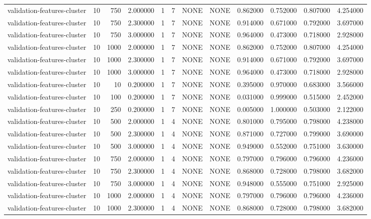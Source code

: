 \begin{tabular}{lrrrllllrrrr}
validation-features-cluster & 10 & 750 & 2.000000 & 1 & 7 & NONE & NONE & 0.862000 & 0.752000 & 0.807000 & 4.254000 \\
validation-features-cluster & 10 & 750 & 2.300000 & 1 & 7 & NONE & NONE & 0.914000 & 0.671000 & 0.792000 & 3.697000 \\
validation-features-cluster & 10 & 750 & 3.000000 & 1 & 7 & NONE & NONE & 0.964000 & 0.473000 & 0.718000 & 2.928000 \\
validation-features-cluster & 10 & 1000 & 2.000000 & 1 & 7 & NONE & NONE & 0.862000 & 0.752000 & 0.807000 & 4.254000 \\
validation-features-cluster & 10 & 1000 & 2.300000 & 1 & 7 & NONE & NONE & 0.914000 & 0.671000 & 0.792000 & 3.697000 \\
validation-features-cluster & 10 & 1000 & 3.000000 & 1 & 7 & NONE & NONE & 0.964000 & 0.473000 & 0.718000 & 2.928000 \\
validation-features-cluster & 10 & 10 & 0.200000 & 1 & 7 & NONE & NONE & 0.395000 & 0.970000 & 0.683000 & 3.566000 \\
validation-features-cluster & 10 & 100 & 0.200000 & 1 & 7 & NONE & NONE & 0.031000 & 0.999000 & 0.515000 & 2.452000 \\
validation-features-cluster & 10 & 250 & 0.200000 & 1 & 7 & NONE & NONE & 0.005000 & 1.000000 & 0.503000 & 2.122000 \\
validation-features-cluster & 10 & 500 & 2.000000 & 1 & 4 & NONE & NONE & 0.801000 & 0.795000 & 0.798000 & 4.238000 \\
validation-features-cluster & 10 & 500 & 2.300000 & 1 & 4 & NONE & NONE & 0.871000 & 0.727000 & 0.799000 & 3.690000 \\
validation-features-cluster & 10 & 500 & 3.000000 & 1 & 4 & NONE & NONE & 0.949000 & 0.552000 & 0.751000 & 3.630000 \\
validation-features-cluster & 10 & 750 & 2.000000 & 1 & 4 & NONE & NONE & 0.797000 & 0.796000 & 0.796000 & 4.236000 \\
validation-features-cluster & 10 & 750 & 2.300000 & 1 & 4 & NONE & NONE & 0.868000 & 0.728000 & 0.798000 & 3.682000 \\
validation-features-cluster & 10 & 750 & 3.000000 & 1 & 4 & NONE & NONE & 0.948000 & 0.555000 & 0.751000 & 2.925000 \\
validation-features-cluster & 10 & 1000 & 2.000000 & 1 & 4 & NONE & NONE & 0.797000 & 0.796000 & 0.796000 & 4.236000 \\
validation-features-cluster & 10 & 1000 & 2.300000 & 1 & 4 & NONE & NONE & 0.868000 & 0.728000 & 0.798000 & 3.682000 \\

\end{tabular}
